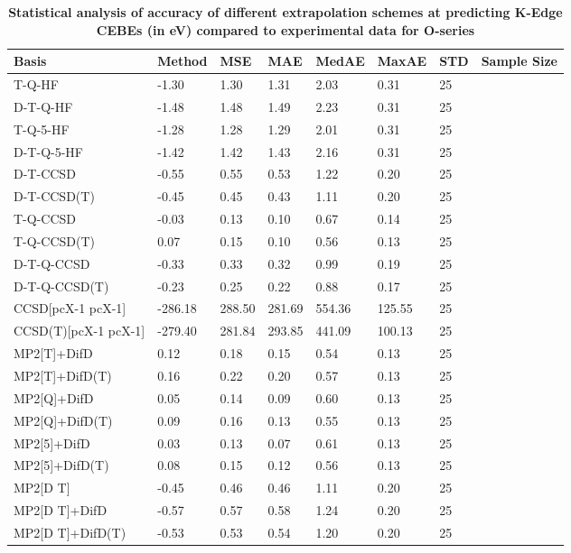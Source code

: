 \begin{table}
  \caption{\textbf{Statistical analysis of accuracy of different extrapolation schemes at predicting K-Edge CEBEs (in eV) compared to experimental data for O-series}}
  \label{tbl:extrap-scheme-summary-o}
  \begin{tabular}{l l l l l l l l }
    \toprule
    \textbf{Basis} & \textbf{Method} & \textbf{MSE} & \textbf{MAE} & \textbf{MedAE} & \textbf{MaxAE} & \textbf{STD} & \textbf{Sample Size} \\ 
    \midrule
    T-Q-HF & -1.30 & 1.30 & 1.31 & 2.03 & 0.31 & 25 \\ 
    D-T-Q-HF & -1.48 & 1.48 & 1.49 & 2.23 & 0.31 & 25 \\ 
    T-Q-5-HF & -1.28 & 1.28 & 1.29 & 2.01 & 0.31 & 25 \\ 
    D-T-Q-5-HF & -1.42 & 1.42 & 1.43 & 2.16 & 0.31 & 25 \\ 
    D-T-CCSD & -0.55 & 0.55 & 0.53 & 1.22 & 0.20 & 25 \\ 
    D-T-CCSD(T) & -0.45 & 0.45 & 0.43 & 1.11 & 0.20 & 25 \\ 
    T-Q-CCSD & -0.03 & 0.13 & 0.10 & 0.67 & 0.14 & 25 \\ 
    T-Q-CCSD(T) & 0.07 & 0.15 & 0.10 & 0.56 & 0.13 & 25 \\ 
    D-T-Q-CCSD & -0.33 & 0.33 & 0.32 & 0.99 & 0.19 & 25 \\ 
    D-T-Q-CCSD(T) & -0.23 & 0.25 & 0.22 & 0.88 & 0.17 & 25 \\ 
    CCSD[pcX-1 pcX-1] & -286.18 & 288.50 & 281.69 & 554.36 & 125.55 & 25 \\ 
    CCSD(T)[pcX-1 pcX-1] & -279.40 & 281.84 & 293.85 & 441.09 & 100.13 & 25 \\ 
    MP2[T]+DifD & 0.12 & 0.18 & 0.15 & 0.54 & 0.13 & 25 \\ 
    MP2[T]+DifD(T) & 0.16 & 0.22 & 0.20 & 0.57 & 0.13 & 25 \\ 
    MP2[Q]+DifD & 0.05 & 0.14 & 0.09 & 0.60 & 0.13 & 25 \\ 
    MP2[Q]+DifD(T) & 0.09 & 0.16 & 0.13 & 0.55 & 0.13 & 25 \\ 
    MP2[5]+DifD & 0.03 & 0.13 & 0.07 & 0.61 & 0.13 & 25 \\ 
    MP2[5]+DifD(T) & 0.08 & 0.15 & 0.12 & 0.56 & 0.13 & 25 \\ 
    MP2[D T] & -0.45 & 0.46 & 0.46 & 1.11 & 0.20 & 25 \\ 
    MP2[D T]+DifD & -0.57 & 0.57 & 0.58 & 1.24 & 0.20 & 25 \\ 
    MP2[D T]+DifD(T) & -0.53 & 0.53 & 0.54 & 1.20 & 0.20 & 25 \\ 

\end{tabular}
\end{table}
